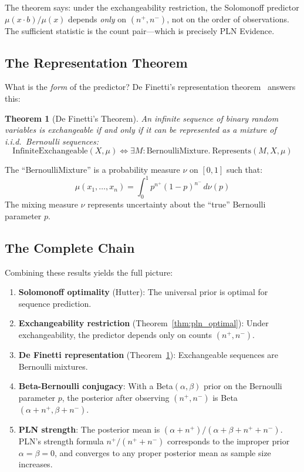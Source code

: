 \documentclass[]{article}
\newtheorem{theorem}{Theorem}
\begin{document}
The theorem says: under the exchangeability restriction, the
Solomonoff predictor $\mu(x \cdot b)/\mu(x)$ depends \emph{only} on
$(n^+, n^-)$, not on the order of observations.  The sufficient
statistic is the count pair---which is precisely PLN Evidence.

\subsection{The Representation Theorem}

What is the \emph{form} of the predictor?  De Finetti's representation
theorem~\cite{definetti1937} answers this:

\begin{theorem}[De Finetti's Theorem]
\label{thm:definetti}
An infinite sequence of binary random variables is exchangeable if and
only if it can be represented as a mixture of i.i.d.\ Bernoulli
sequences:
$$\text{InfiniteExchangeable}(X, \mu) \iff \exists M : \text{BernoulliMixture}.\ \text{Represents}(M, X, \mu)$$
\end{theorem}

The ``BernoulliMixture'' is a probability measure $\nu$ on $[0,1]$
such that:
$$\mu(x_1, \ldots, x_n) = \int_0^1 p^{n^+}(1-p)^{n^-}\, d\nu(p)$$
The mixing measure $\nu$ represents uncertainty about the ``true''
Bernoulli parameter $p$.

\subsection{The Complete Chain}

Combining these results yields the full picture:

\begin{enumerate}
\item \textbf{Solomonoff optimality} (Hutter): The universal prior is
  optimal for sequence prediction.
\item \textbf{Exchangeability restriction} (Theorem~\ref{thm:pln_optimal}):
  Under exchangeability, the predictor depends only on counts $(n^+, n^-)$.
\item \textbf{De Finetti representation} (Theorem~\ref{thm:definetti}):
  Exchangeable sequences are Bernoulli mixtures.
\item \textbf{Beta-Bernoulli conjugacy}: With a Beta$(\alpha, \beta)$
  prior on the Bernoulli parameter $p$, the posterior after observing
  $(n^+, n^-)$ is Beta$(\alpha + n^+, \beta + n^-)$.
\item \textbf{PLN strength}: The posterior mean is $(\alpha +
  n^+)/(\alpha + \beta + n^+ + n^-)$.  PLN's strength formula $n^+ /
  (n^+ + n^-)$ corresponds to the improper prior $\alpha = \beta = 0$,
  and converges to any proper posterior mean as sample size increases.
\end{enumerate}
\end{document}
